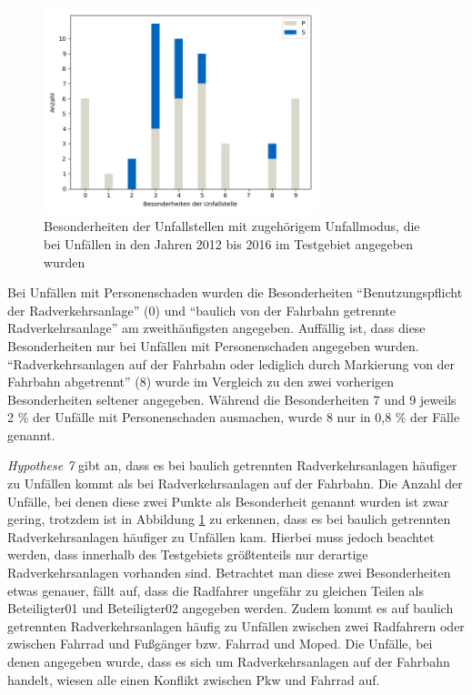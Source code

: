 \begin{savenotes}
	\begin{figure}[H]
		\centering
		\includegraphics[width=8cm,height=6cm]{figures/BES}
		\caption[Besonderheiten der Unfallstelle mit zugehörigem Unfallmodus, die bei Unfällen in den Jahren 2012 bis 2016 im Testgebiet angegeben wurden]{Besonderheiten der Unfallstellen mit zugehörigem Unfallmodus, die bei Unfällen in den Jahren 2012 bis 2016 im Testgebiet angegeben wurden}\label{fig:BES}
	\end{figure}
\end{savenotes}

Bei Unfällen mit Personenschaden wurden die Besonderheiten \enquote{Benutzungspflicht der Radverkehrsanlage} (0) und \enquote{baulich von der Fahrbahn getrennte Radverkehrsanlage} am zweithäufigsten angegeben. Auffällig ist, dass diese Besonderheiten nur bei Unfällen mit Personenschaden angegeben wurden. \enquote{Radverkehrsanlagen auf der Fahrbahn oder lediglich durch Markierung von der Fahrbahn abgetrennt} (8) wurde im Vergleich zu den zwei vorherigen Besonderheiten seltener angegeben. Während die Besonderheiten 7 und 9 jeweils 2 \% der Unfälle mit Personenschaden ausmachen, wurde 8 nur in 0,8 \% der Fälle genannt.

\textit{Hypothese 7} gibt an, dass es bei baulich getrennten Radverkehrsanlagen häufiger zu Unfällen kommt als bei Radverkehrsanlagen auf der Fahrbahn. Die Anzahl der Unfälle, bei denen diese zwei Punkte als Besonderheit genannt wurden ist zwar gering, trotzdem ist in Abbildung \ref{fig:BES} zu erkennen, dass es bei baulich getrennten Radverkehrsanlagen häufiger zu Unfällen  kam. Hierbei muss jedoch beachtet werden, dass innerhalb des Testgebiets größtenteils nur derartige Radverkehrsanlagen vorhanden sind. Betrachtet man diese zwei Besonderheiten etwas genauer, fällt auf, dass die Radfahrer ungefähr zu gleichen Teilen als Beteiligter01 und Beteiligter02 angegeben werden. Zudem kommt es auf baulich getrennten Radverkehrsanlagen häufig zu Unfällen zwischen zwei Radfahrern oder zwischen Fahrrad und Fußgänger bzw. Fahrrad und Moped. Die Unfälle, bei denen angegeben wurde, dass es sich um Radverkehrsanlagen auf der Fahrbahn handelt, wiesen alle einen Konflikt zwischen Pkw und Fahrrad auf.

